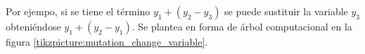 \begin{itemize}
\begin{itemize}
                    Por ejempo, si se tiene el término $y_1 + (y_2 - y_3)$ se puede sustituir la variable $y_3$ obteniéndose $y_1 + (y_2 - y_1)$. Se plantea en forma de árbol computacional en la figura \ref{tikzpicture:mutation_change_variable}.

                    \begin{center}



\end{center}
\end{itemize}
\end{itemize}
